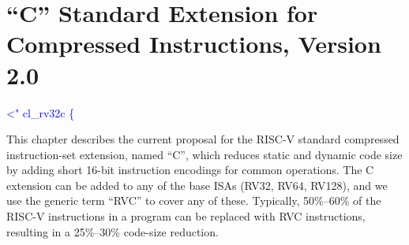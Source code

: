 \chapter{``C'' Standard Extension for Compressed Instructions, Version
2.0}
\label{compressed}

\textcolor{blue}{
\textless" cl\_rv32c \{\\%
}

This chapter describes the current proposal for the RISC-V
standard compressed instruction-set extension, named ``C'', which
reduces static and dynamic code size by adding short 16-bit
instruction encodings for common operations.  The C extension can be
added to any of the base ISAs (RV32, RV64, RV128), and we use the
generic term ``RVC'' to cover any of these.  Typically, 50\%--60\% of
the RISC-V instructions in a program can be replaced with RVC
instructions, resulting in a 25\%--30\% code-size reduction.

